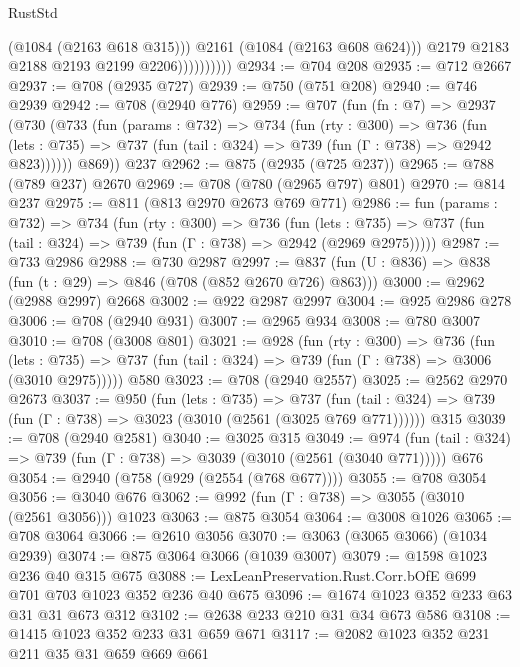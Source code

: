 \begin{lexlean}{RustStd}
\begin{coremodule}
                            (@1084 (@2163 @618 @315)))
                          @2161
                          (@1084 (@2163 @608 @624)))
                        @2179
                        @2183
                        @2188
                        @2193
                        @2199
                        @2206))))))))))
@2934 := @704 @208
@2935 := @712 @2667
@2937 := @708 (@2935 @727)
@2939 := @750 (@751 @208)
@2940 := @746 @2939
@2942 := @708 (@2940 @776)
@2959 := @707
    (fun (fn : @7) =>
    @2937
      (@730
        (@733
          (fun (params : @732) =>
          @734
            (fun (rty : @300) =>
            @736
              (fun (lets : @735) =>
              @737 (fun (tail : @324) => @739 (fun (Γ : @738) => @2942 @823))))))
        @869))
    @237
@2962 := @875 (@2935 (@725 @237))
@2965 := @788 (@789 @237) @2670
@2969 := @708 (@780 (@2965 @797) @801)
@2970 := @814 @237
@2975 := @811 (@813 @2970 @2673 @769 @771)
@2986 := fun (params : @732) =>
  @734
    (fun (rty : @300) =>
    @736
      (fun (lets : @735) =>
      @737 (fun (tail : @324) => @739 (fun (Γ : @738) => @2942 (@2969 @2975)))))
@2987 := @733 @2986
@2988 := @730 @2987
@2997 := @837 (fun (U : @836) => @838 (fun (t : @29) => @846 (@708 (@852 @2670 @726) @863)))
@3000 := @2962 (@2988 @2997) @2668
@3002 := @922 @2987 @2997
@3004 := @925 @2986 @278
@3006 := @708 (@2940 @931)
@3007 := @2965 @934
@3008 := @780 @3007
@3010 := @708 (@3008 @801)
@3021 := @928
    (fun (rty : @300) =>
    @736
      (fun (lets : @735) =>
      @737 (fun (tail : @324) => @739 (fun (Γ : @738) => @3006 (@3010 @2975)))))
    @580
@3023 := @708 (@2940 @2557)
@3025 := @2562 @2970 @2673
@3037 := @950
    (fun (lets : @735) =>
    @737 (fun (tail : @324) => @739 (fun (Γ : @738) => @3023 (@3010 (@2561 (@3025 @769 @771))))))
    @315
@3039 := @708 (@2940 @2581)
@3040 := @3025 @315
@3049 := @974
    (fun (tail : @324) => @739 (fun (Γ : @738) => @3039 (@3010 (@2561 (@3040 @771)))))
    @676
@3054 := @2940 (@758 (@929 (@2554 (@768 @677))))
@3055 := @708 @3054
@3056 := @3040 @676
@3062 := @992 (fun (Γ : @738) => @3055 (@3010 (@2561 @3056))) @1023
@3063 := @875 @3054
@3064 := @3008 @1026
@3065 := @708 @3064
@3066 := @2610 @3056
@3070 := @3063 (@3065 @3066) (@1034 @2939)
@3074 := @875 @3064 @3066 (@1039 @3007)
@3079 := @1598 @1023 @236 @40 @315 @675
@3088 := LexLeanPreservation.Rust.Corr.bOfE @699 @701 @703 @1023 @352 @236 @40 @675
@3096 := @1674 @1023 @352 @233 @63 @31 @31 @673 @312
@3102 := @2638 @233 @210 @31 @34 @673 @586
@3108 := @1415 @1023 @352 @233 @31 @659 @671
@3117 := @2082 @1023 @352 @231 @211 @35 @31 @659 @669 @661

\end{coremodule}
\end{lexlean}
